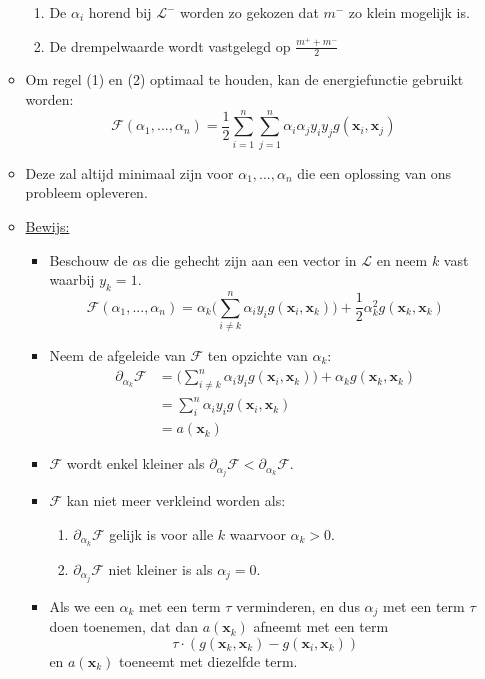 \begin{itemize}
\begin{itemize}
\begin{enumerate}
            \item De $\alpha_i$ horend bij $\mathcal{L}^-$ worden zo gekozen dat $m^-$ zo klein mogelijk is.
            \item De drempelwaarde wordt vastgelegd op $\frac{m^+ + m^-}{2}$
        \end{enumerate}
        \item Om regel (1) en (2) optimaal te houden, kan de energiefunctie gebruikt worden:
        $$\mathcal{F}(\alpha_1, ..., \alpha_n) = \frac{1}{2}\sum_{i = 1}^{n}\sum_{j = 1}^{n} \alpha_i\alpha_jy_iy_jg(\textbf{x}_i, \textbf{x}_j)$$
        \item Deze zal altijd minimaal zijn voor $\alpha_1, ..., \alpha_n$ die een oplossing van ons probleem opleveren.
        \item \underline{Bewijs:}
        \begin{itemize}
            \item Beschouw de $\alpha$s die gehecht zijn aan een vector in $\mathcal{L}$ en neem $k$ vast waarbij $y_k = 1$. 
            $$\mathcal{F}(\alpha_1, ..., \alpha_n) = \alpha_k\bigg(\sum_{i \neq k}^n \alpha_iy_ig(\textbf{x}_i, \textbf{x}_k)\bigg) + \frac{1}{2}\alpha^2_kg(\textbf{x}_k, \textbf{x}_k)$$
            \item Neem de afgeleide van $\mathcal{F}$ ten opzichte van $\alpha_k$:
            \begin{align*}
                \partial_{\alpha_{k}}\mathcal{F} & = \bigg(\sum_{i \neq k}^n \alpha_iy_ig(\textbf{x}_i, \textbf{x}_k)\bigg) + \alpha_kg(\textbf{x}_k, \textbf{x}_k) \\
                & = \sum_{i}^n\alpha_iy_ig(\textbf{x}_i, \textbf{x}_k) \\
                & = a(\textbf{x}_k)
            \end{align*}
            \item $\mathcal{F}$ wordt enkel kleiner als $\partial_{\alpha_{j}}\mathcal{F} < \partial_{\alpha_{k}}\mathcal{F}$.
            \item $\mathcal{F}$ kan niet meer verkleind worden als:
            \begin{enumerate}
                \item $\partial_{\alpha_{k}}\mathcal{F}$ gelijk is voor alle $k$ waarvoor $\alpha_k > 0$.
                \item $\partial_{\alpha_{j}}\mathcal{F}$ niet kleiner is als $\alpha_j = 0$.
            \end{enumerate}
            \item Als we een $\alpha_k$ met een term $\tau$ verminderen, en dus $\alpha_j$ met een term $\tau$ doen toenemen, dat dan $a(\textbf{x}_k)$ afneemt met een term 
            $$\tau \cdot(g(\textbf{x}_k, \textbf{x}_k) - g(\textbf{x}_i, \textbf{x}_k))$$
            en $a(\textbf{x}_k)$ toeneemt met diezelfde term.
      
        \end{itemize}
    \end{itemize}
\end{itemize}
